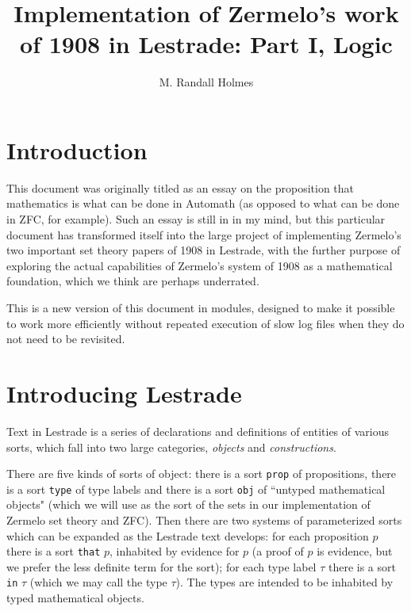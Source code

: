 \documentclass[12pt]{article}
\title{Implementation of Zermelo's work of 1908 in Lestrade:  Part I, Logic}
\author{M. Randall Holmes}
\begin{document}
\maketitle

\section{Introduction}
 
This document was originally titled as an essay on the proposition that mathematics is what can be done in Automath (as opposed to what can be done in ZFC, for example).  Such an essay is still in in my mind, but this particular document has transformed itself into the large project of implementing Zermelo's two important set theory papers of 1908 in Lestrade, with the further purpose of exploring the actual capabilities of Zermelo's system of 1908 as a mathematical foundation, which we think are perhaps underrated.

This is a new version of this document in modules, designed to make it possible to work more efficiently without repeated execution of slow log files when they do not need to be revisited.

\section{Introducing Lestrade}

Text in Lestrade is a series of declarations and definitions of entities of various sorts, which fall into two large categories, {\em objects\/} and {\em constructions\/}.

There are five kinds of sorts of object:  there is a sort {\tt prop} of propositions, there is a sort {\tt type} of type labels and there is a sort {\tt obj} of ``untyped mathematical objects" (which we will use as the sort of the sets in our implementation of Zermelo set theory and ZFC).  Then there are two systems of parameterized sorts which can be expanded as the Lestrade text develops:  for each proposition $p$ there is a sort {\tt that} $p$, inhabited by evidence for $p$ (a proof of $p$ is evidence, but we prefer the less definite term for the sort);  for each type label $\tau$ there is a sort {\tt in} $\tau$ (which we may call the type $\tau$).  The types are intended to be inhabited by typed  mathematical objects.
\end{document}
